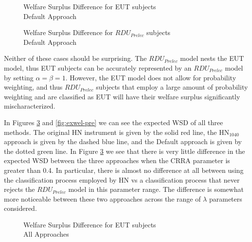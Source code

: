 \documentclass[../main.tex]{subfiles}
\begin{document}
\begin{figure}[h!]
	\center
	\caption{Welfare Surplus Difference for EUT subjects\\Default Approach}
	\label{fig:HN1_def_wel_eut}
\end{figure}

\begin{figure}[h!]
	\center
	\caption{Welfare Surplus Difference for $\mathit{RDU_{Prelec}}$ subjects\\Default Approach}
	\label{fig:HN1_def_wel_pre}
\end{figure}

Neither of these cases should be surprising.
The $\mathit{RDU_{Prelec}}$ model nests the EUT model, thus EUT subjects can be accurately represented by an $\mathit{RDU_{Prelec}}$ model by setting $\alpha = \beta = 1$.
However, the EUT model does not allow for probability weighting, and thus $\mathit{RDU_{Prelec}}$ subjects that employ a large amount of probability weighting and are classified as EUT will have their welfare surplus significantly mischaracterized.

In Figures \ref{fig:exwel-eut} and \ref{fig:exwel-pre} we can see the expected WSD of all three methods.
The original HN instrument is given by the solid red line, the $\text{HN}_{1040}$ approach is given by the dashed blue line, and the Default approach is given by the dotted green line.
In Figure \ref{fig:exwel-eut} we see that there is very little difference in the expected WSD between the three approaches when the CRRA parameter is greater than 0.4.
In particular, there is almost no difference at all between using the classification process employed by HN vs a classification process that never rejects the $\mathit{RDU_{Prelec}}$ model in this parameter range.
The difference is somewhat more noticeable between these two approaches across the range of $\lambda$ parameters considered.

\begin{figure}[ht!]
	\center
	\caption{Welfare Surplus Difference for EUT subjects\\All Approaches}
	\label{fig:exwel-eut}
\end{figure}
\end{document}
